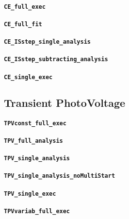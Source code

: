 		\paragraph{\texttt{CE_full_exec}}
		\paragraph{\texttt{CE_full_fit}}
		\paragraph{\texttt{CE_ISstep_single_analysis}}
		\paragraph{\texttt{CE_ISstep_subtracting_analysis}}
		\paragraph{\texttt{CE_single_exec}}


	\subsection{Transient PhotoVoltage}

		\paragraph{\texttt{TPVconst_full_exec}}
		\paragraph{\texttt{TPV_full_analysis}}
		\paragraph{\texttt{TPV_single_analysis}}
		\paragraph{\texttt{TPV_single_analysis_noMultiStart}}
		\paragraph{\texttt{TPV_single_exec}}
		\paragraph{\texttt{TPVvariab_full_exec}}






